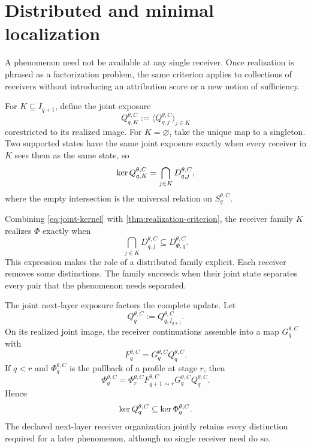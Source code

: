 \section{Distributed and minimal localization}
\label{sec:distributed}

A phenomenon need not be available at any single receiver. Once realization is phrased as a factorization problem, the same criterion applies to collections of receivers without introducing an attribution score or a new notion of sufficiency.

For $K\subseteq I_{q+1}$, define the joint exposure
\[
Q_{q,K}^{\theta,C}
:=
\langle Q_{q,j}^{\theta,C}\rangle_{j\in K}
\]
corestricted to its realized image. For $K=\varnothing$, take the unique map to a singleton. Two supported states have the same joint exposure exactly when every receiver in $K$ sees them as the same state, so
\begin{equation}
\operatorname{ker} Q_{q,K}^{\theta,C}
=
\bigcap_{j\in K}D_{q,j}^{\theta,C},
\label{eq:joint-kernel}
\end{equation}
where the empty intersection is the universal relation on $S_q^{\theta,C}$.

Combining \eqref{eq:joint-kernel} with \cref{thm:realization-criterion}, the receiver family $K$ realizes $\Phi$ exactly when
\begin{equation}
\bigcap_{j\in K}D_{q,j}^{\theta,C}
\subseteq
D_{\Phi,q}^{\theta,C}.
\label{eq:family-realization}
\end{equation}
This expression makes the role of a distributed family explicit. Each receiver removes some distinctions. The family succeeds when their joint state separates every pair that the phenomenon needs separated.

The joint next-layer exposure factors the complete update. Let
\[
Q_q^{\theta,C}:=Q_{q,I_{q+1}}^{\theta,C}.
\]
On its realized joint image, the receiver continuations assemble into a map $G_q^{\theta,C}$ with
\begin{equation}
F_q^{\theta,C}=G_q^{\theta,C}Q_q^{\theta,C}.
\label{eq:joint-factorization}
\end{equation}
If $q<r$ and $\Phi_q^{\theta,C}$ is the pullback of a profile at stage $r$, then
\[
\Phi_q^{\theta,C}
=
\Phi_r^{\theta,C}
F_{q+1\rightsquigarrow r}^{\theta,C}
G_q^{\theta,C}Q_q^{\theta,C}.
\]
Hence
\begin{equation}
\operatorname{ker} Q_q^{\theta,C}
\subseteq
\operatorname{ker}\Phi_q^{\theta,C}.
\label{eq:full-joint-realization}
\end{equation}
The declared next-layer receiver organization jointly retains every distinction required for a later phenomenon, although no single receiver need do so.

